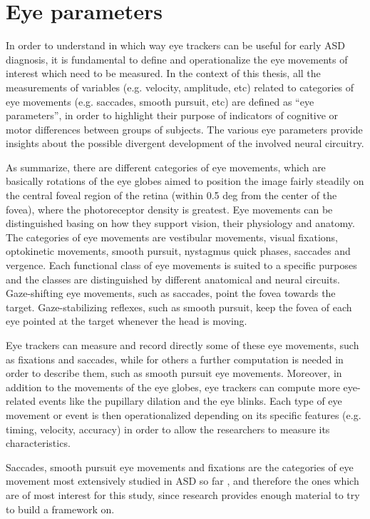 \section{Eye parameters}
\label{sec:eyeparameters}

In order to understand in which way eye trackers can be useful for early ASD diagnosis, it is fundamental to define and operationalize the eye movements of interest which need to be measured. In the context of this thesis, all the measurements of variables (e.g. velocity, amplitude, etc) related to categories of eye movements (e.g. saccades, smooth pursuit, etc) are defined as “eye parameters”, in order to highlight their purpose of indicators of cognitive or motor differences between groups of subjects. The various eye parameters provide insights about the possible divergent development of the involved neural circuitry.

As \citet[pp. 2-5]{leigh2015neurology} summarize, there are different categories of eye movements, which are basically rotations of the eye globes aimed to position the image fairly steadily on the central foveal region of the retina (within 0.5 deg from the center of the fovea), where the photoreceptor density is greatest. Eye movements can be distinguished basing on how they support vision, their physiology and anatomy. The categories of eye movements are vestibular movements, visual fixations, optokinetic movements, smooth pursuit, nystagmus quick phases, saccades and vergence. Each functional class of eye movements is suited to a specific purposes and the classes are distinguished by different anatomical and neural circuits. Gaze-shifting eye movements, such as saccades, point the fovea towards the target. Gaze-stabilizing reflexes, such as smooth pursuit, keep the fovea of each eye pointed at the target whenever the head is moving.

Eye trackers can measure and record directly some of these eye movements, such as fixations and saccades, while for others a further computation is needed in order to describe them, such as smooth pursuit eye movements. Moreover, in addition to the movements of the eye globes, eye trackers can compute more eye-related events like the pupillary dilation and the eye blinks.
Each type of eye movement or event is then operationalized depending on its specific features (e.g. timing, velocity, accuracy) in order to allow the researchers to measure its characteristics.

Saccades, smooth pursuit eye movements and fixations are the categories of eye movement most extensively studied in ASD so far \citep{johnson2016review}, and therefore the ones which are of most interest for this study, since research provides enough material to try to build a framework on.

